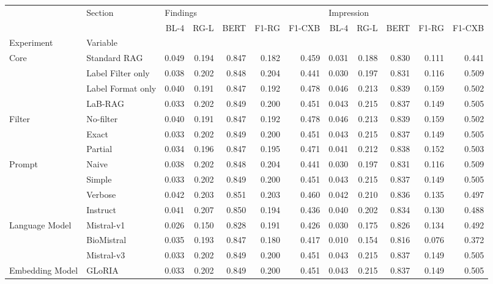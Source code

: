 \begin{tabular}{llrrrrrrrrrr}
\toprule
 & Section & \multicolumn{5}{l}{Findings} & \multicolumn{5}{l}{Impression} \\
 &  & BL-4 & RG-L & BERT & F1-RG & F1-CXB & BL-4 & RG-L & BERT & F1-RG & F1-CXB \\
Experiment & Variable &  &  &  &  &  &  &  &  &  &  \\
\midrule
\multirow[c]{4}{*}{Core} & Standard RAG & 0.049 & 0.194 & 0.847 & 0.182 & 0.459 & 0.031 & 0.188 & 0.830 & 0.111 & 0.441 \\
 & Label Filter only & 0.038 & 0.202 & 0.848 & 0.204 & 0.441 & 0.030 & 0.197 & 0.831 & 0.116 & 0.509 \\
 & Label Format only & 0.040 & 0.191 & 0.847 & 0.192 & 0.478 & 0.046 & 0.213 & 0.839 & 0.159 & 0.502 \\
 & LaB-RAG & 0.033 & 0.202 & 0.849 & 0.200 & 0.451 & 0.043 & 0.215 & 0.837 & 0.149 & 0.505 \\
\cmidrule{1-12}
\multirow[c]{3}{*}{Filter} & No-filter & 0.040 & 0.191 & 0.847 & 0.192 & 0.478 & 0.046 & 0.213 & 0.839 & 0.159 & 0.502 \\
 & Exact & 0.033 & 0.202 & 0.849 & 0.200 & 0.451 & 0.043 & 0.215 & 0.837 & 0.149 & 0.505 \\
 & Partial & 0.034 & 0.196 & 0.847 & 0.195 & 0.471 & 0.041 & 0.212 & 0.838 & 0.152 & 0.503 \\
\cmidrule{1-12}
\multirow[c]{4}{*}{Prompt} & Naive & 0.038 & 0.202 & 0.848 & 0.204 & 0.441 & 0.030 & 0.197 & 0.831 & 0.116 & 0.509 \\
 & Simple & 0.033 & 0.202 & 0.849 & 0.200 & 0.451 & 0.043 & 0.215 & 0.837 & 0.149 & 0.505 \\
 & Verbose & 0.042 & 0.203 & 0.851 & 0.203 & 0.460 & 0.042 & 0.210 & 0.836 & 0.135 & 0.497 \\
 & Instruct & 0.041 & 0.207 & 0.850 & 0.194 & 0.436 & 0.040 & 0.202 & 0.834 & 0.130 & 0.488 \\
\cmidrule{1-12}
\multirow[c]{3}{*}{Language Model} & Mistral-v1 & 0.026 & 0.150 & 0.828 & 0.191 & 0.426 & 0.030 & 0.175 & 0.826 & 0.134 & 0.492 \\
 & BioMistral & 0.035 & 0.193 & 0.847 & 0.180 & 0.417 & 0.010 & 0.154 & 0.816 & 0.076 & 0.372 \\
 & Mistral-v3 & 0.033 & 0.202 & 0.849 & 0.200 & 0.451 & 0.043 & 0.215 & 0.837 & 0.149 & 0.505 \\
\cmidrule{1-12}
\multirow[c]{2}{*}{Embedding Model} & GLoRIA & 0.033 & 0.202 & 0.849 & 0.200 & 0.451 & 0.043 & 0.215 & 0.837 & 0.149 & 0.505 \\

\end{tabular}
